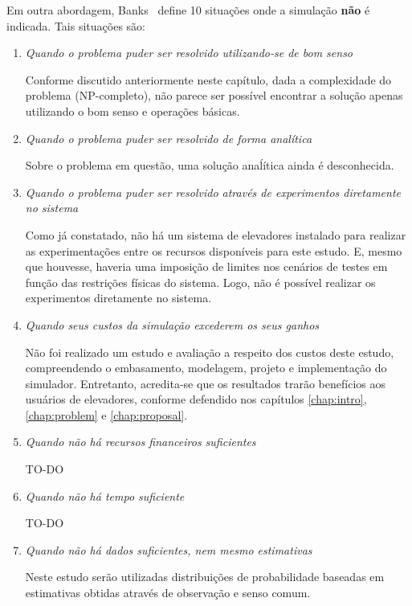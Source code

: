 Em outra abordagem, Banks~\cite{BanksGibson} define 10 situações onde a simulação
\textbf{não} é indicada. Tais situações são:

\begin{enumerate}
\item \textit{Quando o problema puder ser resolvido utilizando-se de bom senso}

Conforme discutido anteriormente neste capítulo, dada a complexidade do problema
(NP-completo), não parece ser possível encontrar a solução apenas utilizando o
bom senso e operações básicas.

\item \textit{Quando o problema puder ser resolvido de forma analítica}

Sobre o problema em questão, uma solução anaĺítica ainda é desconhecida.

\item \textit{Quando o problema puder ser resolvido através de experimentos
diretamente no sistema}

Como já constatado, não há um sistema de elevadores instalado para realizar as
experimentações entre os recursos disponíveis para este estudo. E, mesmo que
houvesse, haveria uma imposição de limites nos cenários de testes em função das
restrições físicas do sistema. Logo, não é possível realizar os experimentos
diretamente no sistema.

\item \textit{Quando seus custos da simulação excederem os seus ganhos}

Não foi realizado um estudo e avaliação a respeito dos custos deste estudo,
compreendendo o embasamento, modelagem, projeto e implementação do simulador.
Entretanto, acredita-se que os resultados trarão benefícios aos usuários de
elevadores, conforme defendido nos capítulos \ref{chap:intro},
\ref{chap:problem} e \ref{chap:proposal}.

\item \textit{Quando não há recursos financeiros suficientes}

TO-DO %

\item \textit{Quando não há tempo suficiente}

TO-DO %

\item \textit{Quando não há dados suficientes, nem mesmo estimativas}

Neste estudo serão utilizadas distribuições de probabilidade baseadas em
estimativas obtidas através de observação e senso comum.


\end{enumerate}
